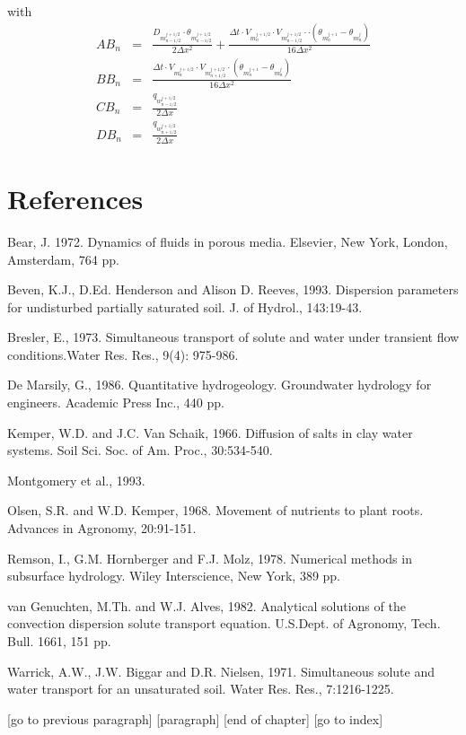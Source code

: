 with
\begin{eqnarray}
AB_n &=& \frac{D_m_{n-1/2}^{j+1/2}\cdot \theta_m_{n-1/2}^{j+1/2}}{2 \Delta x^2} + \frac{\Delta t \cdot V_m_n^{j+1/2}\cdot V_m_{n-1/2}^{j+1/2} \cdot  \cdot(\theta_m_n^{j+1} - \theta_m_n^{j})}{16 \Delta x^2}\\ 
\nonumber
BB_n &=& \frac{\Delta t \cdot V_m_n^{j+1/2}\cdot V_m_{n+1/2}^{j+1/2} \cdot (\theta_m_n^{j+1} - \theta_m_n^{j})}{16 \Delta x^2} \\
\nonumber
CB_n &=& \frac{q_w_{n-1/2}^{j+1/2}}{2\Delta x}\\
\nonumber
DB_n &=& \frac{q_w_{n+1/2}^{j+1/2}}{2\Delta x}
\end{eqnarray}

\section{References}

Bear, J. 1972. Dynamics of fluids in porous media. Elsevier, New York, London, Amsterdam, 764 pp.

Beven, K.J., D.Ed. Henderson and Alison D. Reeves, 1993. Dispersion parameters for undisturbed partially saturated soil. J. of Hydrol., 143:19-43.

Bresler, E., 1973. Simultaneous transport of solute and water under transient flow conditions.Water Res. Res., 9(4): 975-986.

De Marsily, G., 1986. Quantitative hydrogeology. Groundwater hydrology for engineers. Academic Press Inc., 440 pp.

Kemper, W.D. and J.C. Van Schaik, 1966. Diffusion of salts in clay water systems. Soil Sci. Soc. of Am. Proc., 30:534-540.

Montgomery et al., 1993.

Olsen, S.R. and W.D. Kemper, 1968. Movement of nutrients to plant roots. Advances in Agronomy, 20:91-151.

Remson, I., G.M. Hornberger and F.J. Molz, 1978. Numerical methods in subsurface hydrology. Wiley Interscience, New York, 389 pp.

van Genuchten, M.Th. and W.J. Alves, 1982. Analytical solutions of the convection dispersion solute transport equation. U.S.Dept. of Agronomy, Tech. Bull. 1661, 151 pp.

Warrick, A.W., J.W. Biggar and D.R. Nielsen, 1971. Simultaneous solute and water transport for an unsaturated soil. Water Res. Res., 7:1216-1225.

[go to previous paragraph] 	[paragraph] 	[end of chapter]
[go to index]
